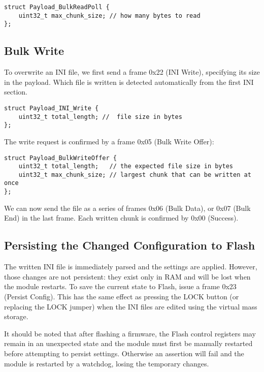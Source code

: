 \begin{verbatim}
struct Payload_BulkReadPoll {
    uint32_t max_chunk_size; // how many bytes to read
};
\end{verbatim}

\subsection{Bulk Write}

To overwrite an INI file, we first send a frame 0x22 (INI Write), specifying its size in the payload. Which file is written is detected automatically from the first INI section.

\begin{verbatim}
struct Payload_INI_Write {
    uint32_t total_length; //  file size in bytes
};
\end{verbatim}

The write request is confirmed by a frame 0x05 (Bulk Write Offer):

\begin{verbatim}
struct Payload_BulkWriteOffer {
    uint32_t total_length;   // the expected file size in bytes
    uint32_t max_chunk_size; // largest chunk that can be written at once
};
\end{verbatim}

We can now send the file as a series of frames 0x06 (Bulk Data), or 0x07 (Bulk End) in the last frame. Each written chunk is confirmed by 0x00 (Success).

\subsection{Persisting the Changed Configuration to Flash}

The written INI file is immediately parsed and the settings are applied. However, those changes are not persistent: they exist only in RAM and will be lost when the module restarts. To save the current state to Flash, issue a frame 0x23 (Persist Config). This has the same effect as pressing the LOCK button (or replacing the LOCK jumper) when the INI files are edited using the virtual mass storage.

It should be noted that after flashing a firmware, the Flash control registers may remain in an unexpected state and the module must first be manually restarted before attempting to persist settings. Otherwise an assertion will fail and the module is restarted by a watchdog, losing the temporary changes.



